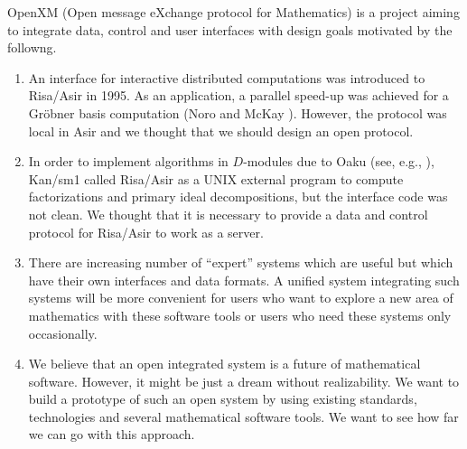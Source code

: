 %
%
OpenXM (Open message eXchange protocol for Mathematics)
is a project aiming to integrate data, control and user interfaces
with design goals motivated by the followng.

\begin{enumerate}
\item 
An interface for interactive distributed computations was introduced
to Risa/Asir in 1995.
As an application,
a parallel speed-up was achieved for a Gr\"obner basis computation
(Noro and McKay \cite{noro-mckay}).
However, the protocol was local in Asir and we thought that we should
design an open protocol.
\item 
In order to implement algorithms in $D$-modules due to Oaku 
(see, e.g., \cite{sst-book}),
Kan/sm1 called Risa/Asir as a UNIX external program to 
compute factorizations and primary ideal decompositions,
but the interface code was not clean.
We thought that it is necessary to provide a data and control protocol
for Risa/Asir to work as a server.

\item 
There are increasing number of ``expert'' systems which are useful
but which have their own interfaces and data formats.
A unified system integrating such systems
will be more convenient
for users who want to explore a new area of mathematics with these
software tools or users who need these systems only occasionally.

\item  We believe that an open integrated system is a future of mathematical
software.
However, it might be just a dream without realizability.
We want to build a prototype of such an open system by using
existing standards, technologies and several mathematical software tools.
We want to see how far we can go with this approach.
\end{enumerate}

